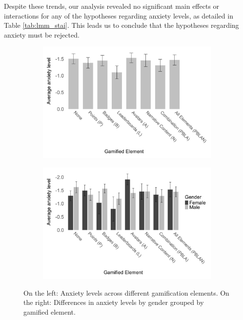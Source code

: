Despite these trends, our analysis revealed no significant main effects or interactions for any of the hypotheses regarding anxiety levels, as detailed in Table \ref{tab:lmm_stai}.
This leads us to conclude that the hypotheses regarding anxiety must be rejected.


\begin{figure}[h]
    \centering
    \begin{subfigure}[b]{0.45\textwidth}
        \includegraphics[width=\textwidth]{img/plots/grey/plot_anxiety.png}
    \end{subfigure}
    \hfill
    \begin{subfigure}[b]{0.45\textwidth}
        \includegraphics[width=\textwidth]{img/plots/grey/plot_anxiety_gender.png}
    \end{subfigure}
    \caption{On the left: Anxiety levels across different gamification elements. On the right: Differences in anxiety levels by gender grouped by gamified element.}
    \label{fig:anxiety_comparison}
\end{figure}

